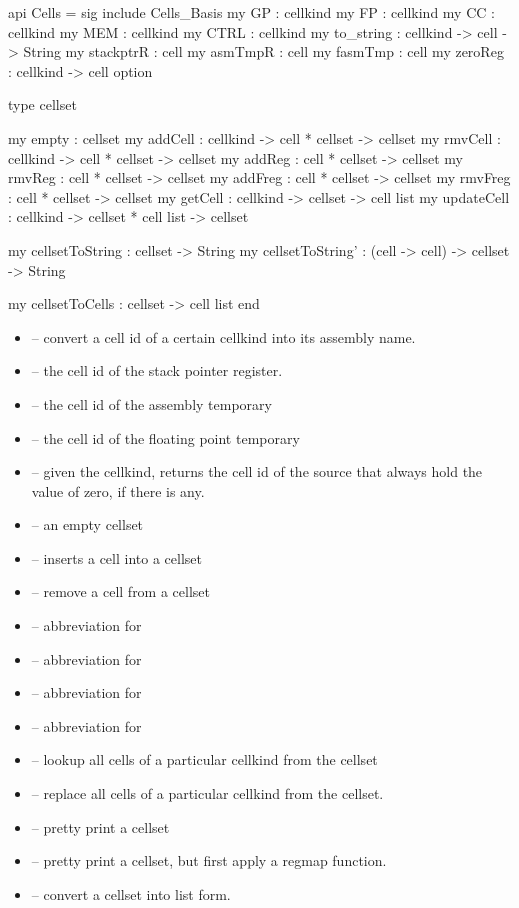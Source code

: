 \begin{SML}
api Cells = sig
   include Cells_Basis
   my GP   : cellkind 
   my FP   : cellkind
   my CC   : cellkind 
   my MEM  : cellkind 
   my CTRL : cellkind 
   my to_string : cellkind -> cell -> String
   my stackptrR : cell 
   my asmTmpR : cell  
   my fasmTmp : cell 
   my zeroReg : cellkind -> cell option

   type cellset

   my empty      : cellset
   my addCell    : cellkind -> cell * cellset -> cellset
   my rmvCell    : cellkind -> cell * cellset -> cellset
   my addReg     : cell * cellset -> cellset
   my rmvReg     : cell * cellset -> cellset
   my addFreg    : cell * cellset -> cellset
   my rmvFreg    : cell * cellset -> cellset
   my getCell    : cellkind -> cellset -> cell list
   my updateCell : cellkind -> cellset * cell list -> cellset

   my cellsetToString : cellset -> String
   my cellsetToString' : (cell -> cell) -> cellset -> String

   my cellsetToCells : cellset -> cell list
end
\end{SML}

\begin{itemize} 
  \item {} -- convert a cell id of a certain cellkind into
its assembly name.
  \item {} -- the cell id of the stack pointer register. 
  \item {} -- the cell id of the assembly temporary 
  \item {} -- the cell id of the floating point temporary
  \item {} -- given the cellkind, returns the cell id of the
   source that always hold the value of zero, if there is any. 
  \item {} -- an empty cellset
  \item {} -- inserts a cell into a cellset
  \item {} -- remove a cell from a cellset
  \item {} -- abbreviation for 
  \item {} -- abbreviation for  
  \item {} -- abbreviation for 
  \item {} -- abbreviation for  
  \item {} -- lookup all cells of a particular cellkind from
the cellset
  \item {} -- replace all cells of a particular cellkind
from the cellset. 
   \item {} -- pretty print a cellset 
   \item {} -- pretty print a cellset, but first
apply a regmap function.
   \item {} -- convert a cellset into list form.
\end{itemize}
